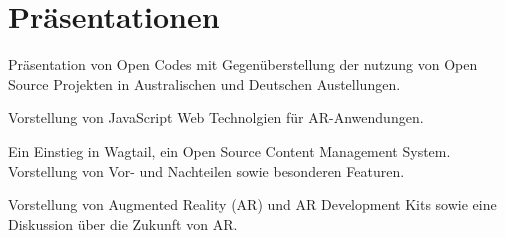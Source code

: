 \documentclass[a4paper]{deedy-resume_twopage} %
\begin{document}
\begin{minipage}[t]{0.66\textwidth} %


  \section{Präsentationen}


  Präsentation von Open Codes mit Gegenüberstellung der nutzung von Open Source Projekten in Australischen und Deutschen Austellungen.
  \sectionspace %



  Vorstellung von JavaScript Web Technolgien für AR-Anwendungen.
  \sectionspace %



  Ein Einstieg in Wagtail, ein Open Source Content Management System. Vorstellung von Vor- und Nachteilen sowie besonderen Featuren.

  \sectionspace %



  Vorstellung von Augmented Reality (AR) und AR Development Kits sowie eine Diskussion über die Zukunft von AR.
  \sectionspace %


\end{minipage}
\end{document}
